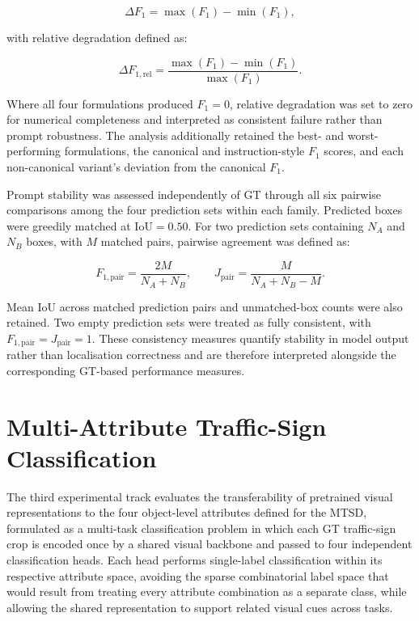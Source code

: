 \begin{equation}
\Delta F_1 =
\max(F_1) - \min(F_1),
\end{equation}

\noindent with relative degradation defined as:

\begin{equation}
\Delta F_{1,\mathrm{rel}} =
\frac{\max(F_1)-\min(F_1)}
{\max(F_1)}.
\end{equation}

\noindent Where all four formulations produced \(F_1=0\), relative degradation was set to zero for numerical completeness and interpreted as consistent failure rather than prompt robustness. The analysis additionally retained the best- and worst-performing formulations, the canonical and instruction-style \(F_1\) scores, and each non-canonical variant's deviation from the canonical \(F_1\).

Prompt stability was assessed independently of \gls{GT} through all six pairwise comparisons among the four prediction sets within each family. Predicted boxes were greedily matched at \(\mathrm{IoU}=0.50\). For two prediction sets containing \(N_A\) and \(N_B\) boxes, with \(M\) matched pairs, pairwise agreement was defined as:

\begin{equation}
F_{1,\mathrm{pair}} =
\frac{2M}{N_A+N_B},
\qquad
J_{\mathrm{pair}} =
\frac{M}{N_A+N_B-M}.
\end{equation}

\noindent Mean \gls{IoU} across matched prediction pairs and unmatched-box counts were also retained. Two empty prediction sets were treated as fully consistent, with \(F_{1,\mathrm{pair}}=J_{\mathrm{pair}}=1\). These consistency measures quantify stability in model output rather than localisation correctness and are therefore interpreted alongside the corresponding \gls{GT}-based performance measures.

\section{Multi-Attribute Traffic-Sign Classification}
\label{sec:attr-cls}
The third experimental track evaluates the transferability of pretrained visual representations to the four object-level attributes defined for the \gls{MTSD}, formulated as a multi-task classification problem in which each \gls{GT} traffic-sign crop is encoded once by a shared visual backbone and passed to four independent classification heads. Each head performs single-label classification within its respective attribute space, avoiding the sparse combinatorial label space that would result from treating every attribute combination as a separate class, while allowing the shared representation to support related visual cues across tasks.

